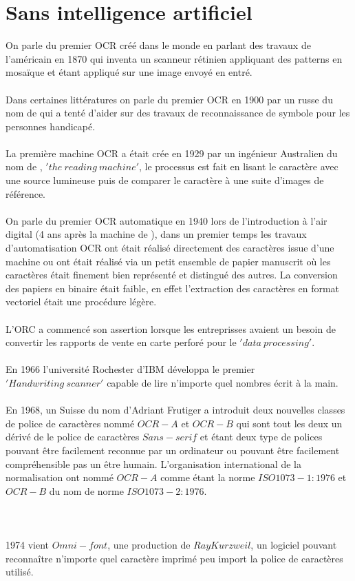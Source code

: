 
\section{Sans intelligence artificiel}
On parle du premier OCR créé dans le monde en parlant des travaux de l'américain  en 1870 qui inventa un scanneur rétinien appliquant des patterns en mosaïque et étant appliqué sur une image envoyé en entré.\\
\\
Dans certaines littératures on parle du premier OCR en 1900 par un russe du nom de  qui a tenté d'aider sur des travaux de reconnaissance de symbole pour les personnes handicapé.\\
\\
La première machine OCR a était crée en 1929 par un ingénieur Australien du nom de , $'the\ reading\ machine'$, le processus est fait en lisant le caractère avec une source lumineuse puis de comparer le caractère à une suite d'images de référence.\\
\\
On parle du premier OCR automatique en 1940 lors de l'introduction à l'air digital (4 ans après la machine de ), dans un premier temps  les travaux d'automatisation OCR ont était réalisé directement des caractères issue d'une machine ou ont était réalisé via un petit ensemble de papier manuscrit où les caractères était finement bien représenté et distingué des autres. La conversion des papiers en binaire était faible, en effet l'extraction des caractères en format vectoriel était une procédure légère.\\
\\
L'ORC a commencé son assertion lorsque les entreprisses avaient un besoin de convertir les rapports de vente en carte perforé pour le $'data\ processing'$.\\
\\
En 1966 l'université Rochester d'IBM développa le premier $'Handwriting\ scanner'$ capable de lire n'importe quel nombres écrit à la main.\\
\\
En 1968, un Suisse du nom d'Adriant Frutiger a introduit deux nouvelles classes de police de caractères nommé $OCR-A$ et $OCR-B$ qui sont tout les deux un dérivé de le police de caractères $Sans-serif$ et étant deux type de polices pouvant être facilement reconnue par un ordinateur ou pouvant être facilement compréhensible pas un être humain. L'organisation international de la normalisation ont nommé $OCR-A$ comme étant la norme $ISO 1073-1:1976$ et $OCR-B$ du nom de norme $ISO 1073-2:1976$.
\\\\\\\\
1974 vient $Omni-font$, une production de $Ray Kurzweil$, un logiciel pouvant reconnaître n'importe quel caractère imprimé peu import la police de caractères utilisé.\\
\\

